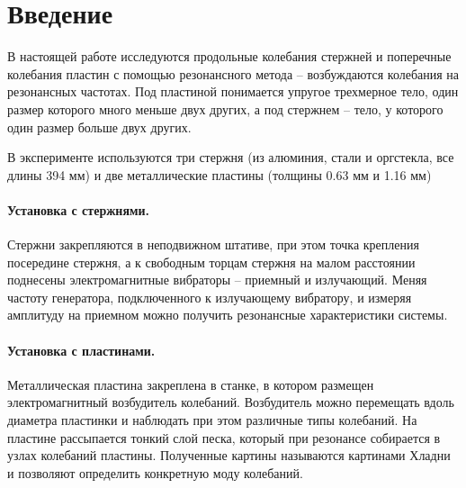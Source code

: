 \documentclass[a4paper,14pt]{extarticle}
\begin{document}


\tableofcontents
\newpage



\section*{Введение}
\vspace{-0.5em}
В настоящей работе исследуются продольные колебания стержней и поперечные колебания пластин с помощью резонансного метода -- возбуждаются колебания на резонансных частотах. Под пластиной понимается упругое трехмерное тело, один размер которого много меньше двух других, а под стержнем -- тело, у которого один размер больше двух других. 

В эксперименте используются три стержня (из алюминия, стали и оргстекла, все длины 394 мм) и две металлические пластины (толщины 0.63 мм и 1.16 мм)
\vspace{-0.5em}


\paragraph{Установка с стержнями.} Стержни закрепляются в неподвижном штативе, при этом точка крепления посередине стержня,  а к свободным торцам стержня на малом расстоянии поднесены электромагнитные вибраторы -- приемный и излучающий. Меняя частоту генератора, подключенного к излучающему вибратору, и измеряя амплитуду на приемном можно получить резонансные характеристики системы.

\paragraph{Установка с пластинами.} Металлическая пластина закреплена в станке, в котором размещен электромагнитный возбудитель колебаний. Возбудитель можно перемещать вдоль диаметра пластинки и наблюдать при этом различные типы колебаний. На пластине рассыпается тонкий слой песка, который при резонансе собирается в узлах колебаний пластины. Полученные картины называются картинами Хладни и позволяют определить конкретную моду колебаний.

\end{document}

